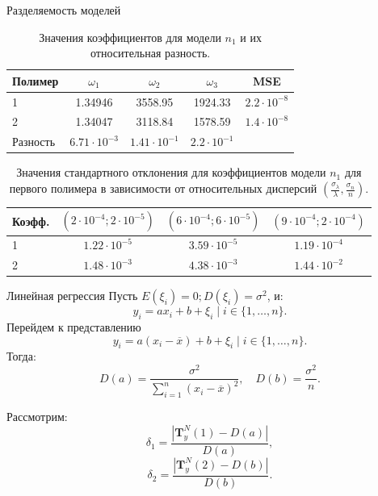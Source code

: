 \documentclass{beamer}
\begin{document}
\begin{frame}{Разделяемость моделей}
  \begin{table}[h]
    \centering
    \footnotesize
    \begin{tabular}{| l | c | c | c | c |} \hline
  	Полимер		& $\omega_1$		& $\omega_2$		& $\omega_3$		& MSE	\\ \hline
      1			& 1.34946		& 3558.95		& 1924.33		& $2.2 \cdot 10^{-8}$		\\ \hline
      2			& 1.34047		& 3118.84		& 1578.59		& $1.4 \cdot 10^{-8}$		\\ \hline
  	Разность	& $6.71 \cdot 10^{-3}$	& $1.41 \cdot 10^{-1}$	& $2.2 \cdot 10^{-1}$	&	\\ \hline
    \end{tabular}
    \caption{Значения коэффициентов для модели $n_1$ и их относительная разность.}
  \end{table}
  
  \begin{table}[h]
    \centering
    \footnotesize
    \begin{tabular}{| l | c | c | c |} \hline
	  Коэфф.	& $(2 \cdot 10^{-4}; 2 \cdot 10^{-5})$	& $ (6 \cdot 10^{-4}; 6 \cdot 10^{-5}) $	& $ (9 \cdot 10^{-4}; 2 \cdot 10^{-4}) $ \\ \hline
	  1		& $1.22 \cdot 10^{-5}$					& $ 3.59 \cdot 10^{-5} $					& $ 1.19 \cdot 10^{-4} $		\\ \hline
	  2		& $1.48 \cdot 10^{-3}$					& $ 4.38 \cdot 10^{-3} $					& $ 1.44 \cdot 10^{-2} $		\\ \hline
    \end{tabular}
    \caption{Значения стандартного отклонения для коэффициентов модели $n_1$ для первого полимера в зависимости от относительных дисперсий $(\frac{\sigma_{\lambda}}{\lambda}, \frac{\sigma_n}{n})$.}
  \end{table}
\end{frame}

\begin{frame}{Линейная регрессия}
  Пусть $E(\xi_i) = 0; D(\xi_i) = \sigma^2$, и:
  \[
    y_i = ax_i + b + \xi_i \mid i \in \{ 1, \dots, n \}.
  \]
  Перейдем к представлению
  \[
    y_i = a(x_i - \overline{x}) + b + \xi_i \mid i \in \{ 1, \dots, n \}.
  \]
  Тогда:
  \[
    D(a) = \frac{\sigma^2}{\sum_{i = 1}^n (x_i - \overline{x})^2}, \quad D(b) = \frac{\sigma^2}{n}.
  \]
  
  Рассмотрим:
  \[
    \delta_1 = \frac{| \mathbf{T}^N_y(1) - D(a) |}{D(a)},
  \]
  \[
    \delta_2 = \frac{| \mathbf{T}^N_y(2) - D(b) |}{D(b)}.
  \]
\end{frame}
\end{document}
